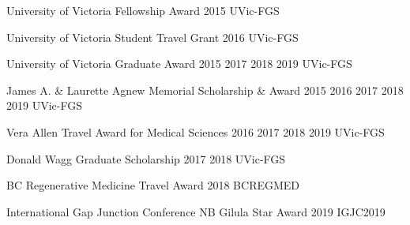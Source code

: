 



\begin{cvhonors}

  \cvhonor
    {University of Victoria Fellowship Award} %
    {2015} %
    {UVic-FGS} %
    {} %

  \cvhonor
    {University of Victoria Student Travel Grant} %
    {2016} %
    {UVic-FGS} %
    {} %

  \cvhonor
    {University of Victoria Graduate Award} %
    {2015 2017 2018 2019} %
    {UVic-FGS} %
    {} %

  \cvhonor
    {James A. \& Laurette Agnew Memorial Scholarship \& Award} %
    {2015 2016 2017 2018 2019} %
    {UVic-FGS} %
    {} %

  \cvhonor
    {Vera Allen Travel Award for Medical Sciences} %
    {2016 2017 2018 2019} %
    {UVic-FGS} %
    {} %

  \cvhonor
    {Donald Wagg Graduate Scholarship} %
    {2017 2018} %
    {UVic-FGS} %
    {} %

  \cvhonor
  {BC Regenerative Medicine Travel Award} %
  {2018} %
  {BCREGMED} %
  {} %

  \cvhonor
  {International Gap Junction Conference NB Gilula Star Award} %
  {2019} %
  {IGJC2019} %
  {} %


\end{cvhonors}
